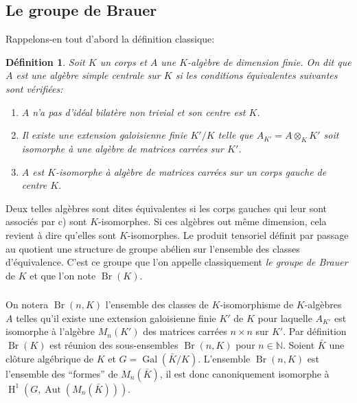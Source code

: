 \documentclass{book}
\DeclareMathOperator{\aut}{Aut}
\DeclareMathOperator{\br}{Br}
\DeclareMathOperator{\gal}{Gal}
\DeclareMathOperator{\h}{H}
\newcommand{\dN}{\mathbb{N}}
\newtheorem{definition}[subsubsection]{Définition}
\begin{document}
\subsection{Le groupe de Brauer}\label{I:3-1}

Rappelons-en tout d'abord la définition classique:





\begin{definition}\label{I:3-1-1}
Soit $K$ un corps et $A$ une $K$-algèbre de dimension finie. On dit que $A$ 
est une algèbre simple centrale sur $K$ si les conditions équivalentes 
suivantes sont vérifiées:
\begin{enumerate}[\indent a)]
  \item $A$ n'a pas d'idéal bilatère non trivial et son centre est $K$. 
  \item Il existe une extension galoisienne finie $K'/K$ telle que 
    $A_{K'} = A\otimes_K K'$ soit isomorphe à une algèbre de matrices 
    carrées sur $K'$.
  \item $A$ est $K$-isomorphe à algèbre de matrices carrées sur un corps 
    gauche de centre $K$.
\end{enumerate}
\end{definition}

Deux telles algèbres sont dites équivalentes si les corps gauches qui 
leur sont associés par c) sont $K$-isomorphes. Si ces algèbres out 
même dimension, cela revient à dire qu'elles sont $K$-isomorphes. Le 
produit tensoriel définit par passage au quotient une structure de groupe 
abélien sur l'ensemble des classes d'équivalence. C'est ce groupe que l'on 
appelle classiquement \emph{le groupe de Brauer} de $K$ et que l'on note 
$\br(K)$. 





\subsubsection{}\label{I:3-1-2}

On notera $\br(n,K)$ l'ensemble des classes de $K$-isomorphisme de 
$K$-algèbres $A$ telles qu'il existe une extension galoisienne finie $K'$ de 
$K$ pour laquelle $A_{K'}$ est isomorphe à l'algèbre $M_n(K')$ des matrices 
carrées $n\times n$ sur $K'$. Par définition $\br(K)$ est réunion des 
sous-ensembles $\br(n,K)$ pour $n\in\dN$. Soient $\bar K$ une clôture 
algébrique de $K$ et $G=\gal(\bar K/K)$. L'ensemble $\br(n,K)$ est 
l'ensemble des ``formes'' de $M_n(\bar K)$, il est donc canoniquement 
isomorphe à $\h^1\left(G,\aut(M_n(\bar K))\right)$. 
\end{document}
